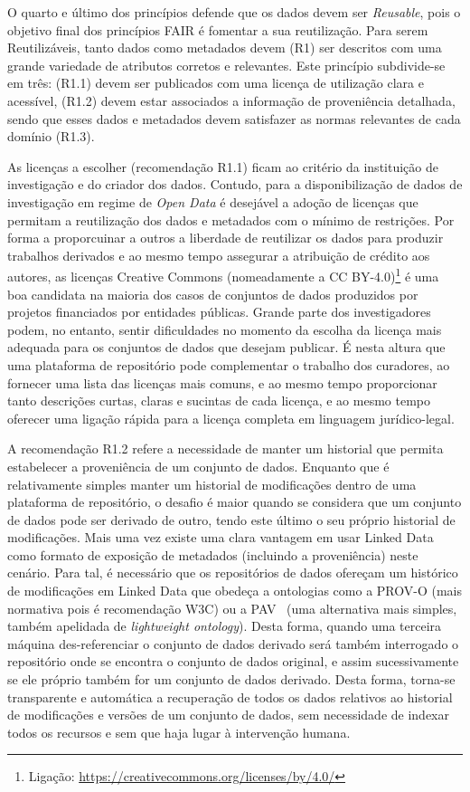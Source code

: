 \documentclass[sigconf,nonacm]{acmart}
\begin{document}
O quarto e último dos princípios defende que os dados devem ser \textit{Reusable}, pois o objetivo final dos princípios FAIR é fomentar a sua reutilização. Para serem Reutilizáveis, tanto dados como metadados devem (R1) ser descritos com uma grande variedade de atributos corretos e relevantes. Este princípio subdivide-se em três: (R1.1) devem ser publicados com uma licença de utilização clara e acessível, (R1.2) devem estar associados a informação de proveniência detalhada, sendo que esses dados e metadados devem satisfazer as normas relevantes de cada domínio (R1.3).

As licenças a escolher (recomendação R1.1) ficam ao critério da instituição de investigação e do criador dos dados. Contudo, para a disponibilização de dados de investigação em regime de \emph{Open Data} é desejável a adoção de licenças que permitam a reutilização dos dados e metadados com o mínimo de restrições. Por forma a proporcuinar a outros a liberdade de reutilizar os dados para produzir trabalhos derivados e ao mesmo tempo assegurar a atribuição de crédito aos autores, as licenças Creative Commons (nomeadamente a CC BY-4.0)\footnote{Ligação: \url{https://creativecommons.org/licenses/by/4.0/}} é uma boa candidata na maioria dos casos de conjuntos de dados produzidos por projetos financiados por entidades públicas. Grande parte dos investigadores podem, no entanto, sentir dificuldades no momento da escolha da licença mais adequada para os conjuntos de dados que desejam publicar. É nesta altura que uma plataforma de repositório pode complementar o trabalho dos curadores, ao fornecer uma lista das licenças mais comuns, e ao mesmo tempo proporcionar tanto descrições curtas, claras e sucintas de cada licença, e ao mesmo tempo oferecer uma ligação rápida para a licença completa em linguagem jurídico-legal. 

A recomendação R1.2 refere a necessidade de manter um historial que permita estabelecer a proveniência de um conjunto de dados. Enquanto que é relativamente simples manter um historial de modificações dentro de uma plataforma de repositório, o desafio é maior quando se considera que um conjunto de dados pode ser derivado de outro, tendo este último o seu próprio historial de modificações. Mais uma vez existe uma clara vantagem em usar Linked Data como formato de exposição de metadados (incluindo a proveniência) neste cenário. Para tal, é necessário que os repositórios de dados ofereçam um histórico de modificações em Linked Data que obedeça a ontologias como a PROV-O\cite{lebo2013prov} (mais normativa pois é recomendação W3C) ou a PAV~\cite{ciccarese2013pav} (uma alternativa mais simples, também apelidada de \emph{lightweight ontology}). Desta forma, quando uma terceira máquina des-referenciar o conjunto de dados derivado será também interrogado o repositório onde se encontra o conjunto de dados original, e assim sucessivamente se ele próprio também for um conjunto de dados derivado. Desta forma, torna-se transparente e automática a recuperação de todos os dados relativos ao historial de modificações e versões de um conjunto de dados, sem necessidade de indexar todos os recursos e sem que haja lugar à intervenção humana.
\end{document}
